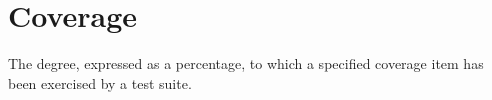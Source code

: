 \section{Coverage}
\label{sec:Coverage}

The degree, expressed as a percentage, to which a specified coverage item has been exercised by a test suite.

